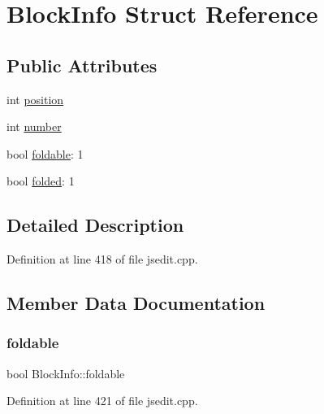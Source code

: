 \hypertarget{struct_block_info}{}\section{Block\+Info Struct Reference}
\label{struct_block_info}
\subsection*{Public Attributes}
\begin{DoxyCompactItemize}
\item 
int \hyperlink{struct_block_info_a6333e999c5d9f3e8882776e66eb087c0}{position}
\item 
int \hyperlink{struct_block_info_a7f39cc445f8a30a859859f49e59640ee}{number}
\item 
bool \hyperlink{struct_block_info_a777eccf7133be7d93623791ffd0a3282}{foldable}\+: 1
\item 
bool \hyperlink{struct_block_info_a1aac7802107d29f5fc685a355a75ce1d}{folded}\+: 1
\end{DoxyCompactItemize}


\subsection{Detailed Description}


Definition at line 418 of file jsedit.\+cpp.



\subsection{Member Data Documentation}
\mbox{\label{struct_block_info_a777eccf7133be7d93623791ffd0a3282}} 
\subsubsection{\texorpdfstring{foldable}{foldable}}
{\footnotesize\ttfamily bool Block\+Info\+::foldable}



Definition at line 421 of file jsedit.\+cpp.

\mbox{\label{struct_block_info_a1aac7802107d29f5fc685a355a75ce1d}} 
